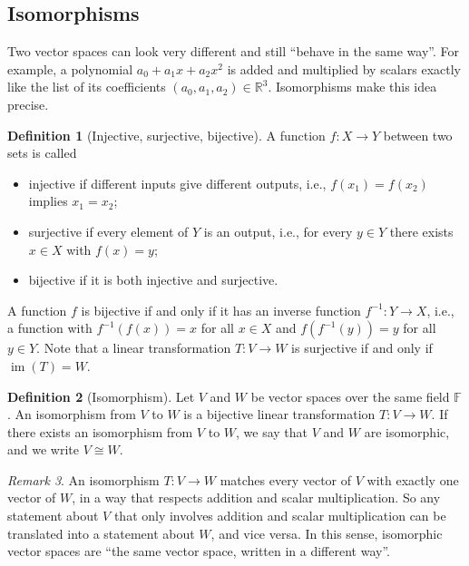 \documentclass[11pt]{article}
\theoremstyle{definition}
\newtheorem{definition}{Definition}[section]
\theoremstyle{plain}
\theoremstyle{remark}
\newtheorem{remark}[definition]{Remark}
\DeclareMathOperator{\im}{im}
\begin{document}
\subsection{Isomorphisms}

Two vector spaces can look very different and still ``behave in the same way''. For example, a polynomial $a_0 + a_1 x + a_2 x^2$ is added and multiplied by scalars exactly like the list of its coefficients $(a_0, a_1, a_2) \in \mathbb{R}^3$. Isomorphisms make this idea precise.

\begin{definition}[Injective, surjective, bijective]
    A function $f: X \to Y$ between two sets is called
    \begin{itemize}
        \item injective if different inputs give different outputs, i.e., $f(x_1) = f(x_2)$ implies $x_1 = x_2$;
        \item surjective if every element of $Y$ is an output, i.e., for every $y \in Y$ there exists $x \in X$ with $f(x) = y$;
        \item bijective if it is both injective and surjective.
    \end{itemize}
    A function $f$ is bijective if and only if it has an inverse function $f^{-1}: Y \to X$, i.e., a function with $f^{-1}(f(x)) = x$ for all $x \in X$ and $f(f^{-1}(y)) = y$ for all $y \in Y$. Note that a linear transformation $T: V \to W$ is surjective if and only if $\im(T) = W$.
\end{definition}

\begin{definition}[Isomorphism]
    Let $V$ and $W$ be vector spaces over the same field $\mathbb{F}$. An isomorphism from $V$ to $W$ is a bijective linear transformation $T: V \to W$. If there exists an isomorphism from $V$ to $W$, we say that $V$ and $W$ are isomorphic, and we write $V \cong W$.
\end{definition}

\begin{remark}
    An isomorphism $T: V \to W$ matches every vector of $V$ with exactly one vector of $W$, in a way that respects addition and scalar multiplication. So any statement about $V$ that only involves addition and scalar multiplication can be translated into a statement about $W$, and vice versa. In this sense, isomorphic vector spaces are ``the same vector space, written in a different way''.
\end{remark}
\end{document}
